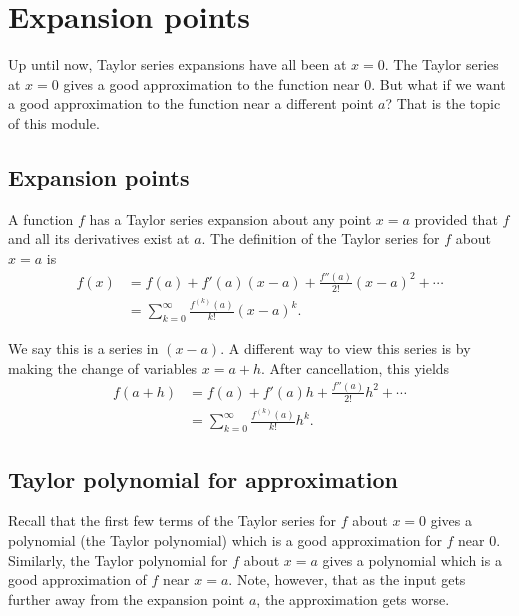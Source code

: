 \documentclass[twoside,openright,titlepage,a4paper]{book}
\begin{document}
\begin{sloppypar}
\section{Expansion points} \label{ChFunctionsSecExpansionPoints}

Up until now, Taylor series expansions have all been at $x=0$. The Taylor series at $x=0$ gives a good approximation to the function near 0. But what if we want a good approximation to the function near a different point $a$? That is the topic of this module.

\subsection{Expansion points}

A function $f$ has a Taylor series expansion about any point $x=a$ provided that $f$ and all its derivatives exist at $a$. The definition of the Taylor series for $f$ about $x=a$ is
\begin{align*}
f(x) &= f(a) + f'(a)(x-a) + \frac{f''(a)}{2!}(x-a)^2 + \dotsb \\
&= \sum_{k=0}^\infty \frac{f^{\left(k\right)}(a)}{k!}(x-a)^k. 
\end{align*}

We say this is a series in $(x-a)$. A different way to view this series is by making the change of variables $x = a+h$. After cancellation, this yields
\begin{align*} 
f(a+h) &= f(a) + f'(a)h + \frac{f''(a)}{2!}h^2 + \dotsb \\
&= \sum_{k=0}^\infty \frac{f^{\left(k\right)}(a)}{k!}h^k. 
\end{align*}

\subsection{Taylor polynomial for approximation}

Recall that the first few terms of the Taylor series for $f$ about $x=0$ gives a polynomial (the Taylor polynomial) which is a good approximation for $f$ near 0. Similarly, the Taylor polynomial for $f$ about $x=a$ gives a polynomial which is a good approximation of $f$ near $x=a$. Note, however, that as the input gets further away from the expansion point $a$, the approximation gets worse.


\end{sloppypar}
\end{document}
